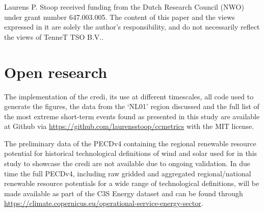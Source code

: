 \documentclass[12pt]{iopart}
\newcommand{\credi}[0]{{\sc credi}}
\begin{document}
\clearpage
\ack %
Laurens P. Stoop received funding from the  Dutch Research Council (NWO) under grant number 647.003.005. 
The content of this paper and the views expressed in it are solely the author’s responsibility, and do not necessarily reflect the views of TenneT TSO B.V..

\section*{Open research} 
The implementation of the \credi{}, its use at different timescales, all code used to generate the figures, the data from the `NL01' region discussed and the full list of the most extreme short-term events found as presented in this study are available at Github via \url{https://github.com/laurensstoop/ccmetrics} with the MIT license. 

The preliminary data of the PECDv4 containing the regional renewable resource potential for historical technological definitions of wind and solar used for in this study to showcase the \credi{} are not available due to ongoing validation. 
In due time the full PECDv4, including raw gridded and aggregated regional/national renewable resource potentials for a wide range of technological definitions, will be made available as part of the C3S Energy dataset and can be found through \url{https://climate.copernicus.eu/operational-service-energy-sector}. 

\printbibliography 
\end{document}
